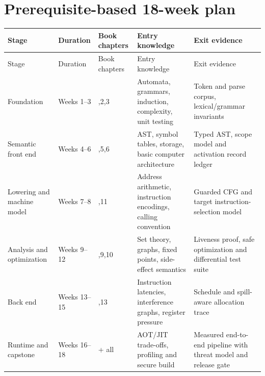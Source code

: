 \documentclass[10pt,letterpaper]{article}
\begin{document}
\section{Prerequisite-based 18-week plan}
\begin{longtable}{|>{\raggedright\arraybackslash}p{}|>{\raggedright\arraybackslash}p{}|>{\raggedright\arraybackslash}p{}|>{\raggedright\arraybackslash}p{}|>{\raggedright\arraybackslash}p{}|}
\hline
Stage & Duration & Book chapters & Entry knowledge & Exit evidence\\ \hline\endfirsthead
\hline
Stage & Duration & Book chapters & Entry knowledge & Exit evidence\\ \hline\endhead
Foundation & Weeks 1--3 & 1,2,3 & Automata, grammars, induction, complexity, unit testing & Token and parse corpus, lexical/grammar invariants\\ \hline
Semantic front end & Weeks 4--6 & 4,5,6 & AST, symbol tables, storage, basic computer architecture & Typed AST, scope model and activation record ledger\\ \hline
Lowering and machine model & Weeks 7--8 & 7,11 & Address arithmetic, instruction encodings, calling convention & Guarded CFG and target instruction-selection model\\ \hline
Analysis and optimization & Weeks 9--12 & 8,9,10 & Set theory, graphs, fixed points, side-effect semantics & Liveness proof, safe optimization and differential test suite\\ \hline
Back end & Weeks 13--15 & 12,13 & Instruction latencies, interference graphs, register pressure & Schedule and spill-aware allocation trace\\ \hline
Runtime and capstone & Weeks 16--18 & 14 + all & AOT/JIT trade-offs, profiling and secure build & Measured end-to-end pipeline with threat model and release gate\\ \hline
\end{longtable}
\end{document}
